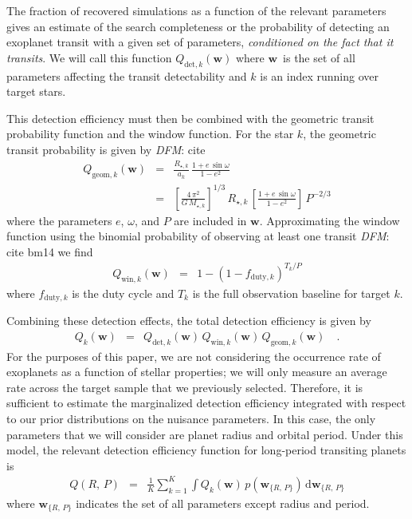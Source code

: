 \documentclass[manuscript, letterpaper]{aastex6}
\newcommand{\paper}{paper}
\newcommand{\eqlabel}[1]{\label{eq:#1}}
\newcommand{\dd}{\ensuremath{\,\mathrm{d}}}
\newcommand{\bvec}[1]{{\ensuremath{\boldsymbol{#1}}}}
\newcommand{\todo}[3]{{\color{#2}\emph{#1}: #3}}
\newcommand{\dfmtodo}[1]{\todo{DFM}{red}{#1}}
\newcommand{\params}{{\ensuremath{\bvec{w}}}}
\begin{document}
The fraction of recovered simulations as a function of the relevant parameters
gives an estimate of the search completeness or the probability of detecting
an exoplanet transit with a given set of parameters, \emph{conditioned on the
fact that it transits}.
We will call this function $Q_{\mathrm{det},k}(\params)$ where \params\ is the
set of all parameters affecting the transit detectability and $k$ is an index
running over target stars.

This detection efficiency must then be combined with the geometric transit
probability function and the window function.
For the star $k$, the geometric transit probability is given by \dfmtodo{cite}
\begin{eqnarray}
Q_{\mathrm{geom},k} (\params) &=& \frac{R_{\star,k}}{a_k}
    \, \frac{1 + e\,\sin\omega}{1-e^2} \\
&=& \left[\frac{4\,\pi^2}{G\,M_{\star,k}}\right]^{1/3}\,R_{\star,k}
    \, \left[\frac{1 + e\,\sin \omega}{1-e^2}\right]
    \, P^{-2/3}
\end{eqnarray}
where the parameters $e$, $\omega$, and $P$ are included in \params.
Approximating the window function using the binomial probability of observing
at least one transit \dfmtodo{cite bm14} we find
\begin{eqnarray}
Q_{\mathrm{win},k} (\params) &=& 1 - (1 - f_{\mathrm{duty},k})^{T_k/P}
\end{eqnarray}
where $f_{\mathrm{duty},k}$ is the duty cycle and $T_k$ is the full
observation baseline for target $k$.

Combining these detection effects, the total detection efficiency is given by
\begin{eqnarray}
Q_k(\params) &=& Q_{\mathrm{det},k}(\params) \,
                 Q_{\mathrm{win},k} (\params) \,
                 Q_{\mathrm{geom},k} (\params) \quad.
\end{eqnarray}
For the purposes of this \paper, we are not considering the occurrence rate of
exoplanets as a function of stellar properties; we will only measure an
average rate across the target sample that we previously selected.
Therefore, it is sufficient to estimate the marginalized detection efficiency
integrated with respect to our prior distributions on the nuisance parameters.
In this case, the only parameters that we will consider are planet radius and
orbital period.
Under this model, the relevant detection efficiency function for long-period
transiting planets is
\begin{eqnarray}\eqlabel{full-comp}
Q(R,\,P) &=& \frac{1}{K} \sum_{k=1}^{K} \int Q_k(\params) \,
    p(\params_{\{R,\,P\}}) \dd\params_{\{R,\,P\}}
\end{eqnarray}
where $\params_{\{R,\,P\}}$ indicates the set of all parameters except radius
and period.
\end{document}
